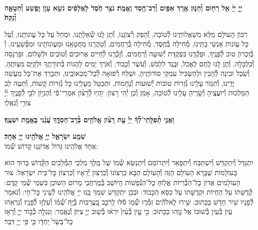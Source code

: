 \documentclass[twoside, openany, parskip=half, 11pt]{book}
\begin{document}
\pesicha

\begin{sometimes}

\\
 \textbf{יְיָ֣ יְיָ֔ אֵ֥ל רַח֖וּם וְ֯חַנּ֑וּן אֶ֥רֶךְ אַפַּ֖יִם וְ֯רַב־חֶ֥סֶד וֶאֱמֶֽת׃ נֹצֵ֥ר חֶ֙סֶד֙ לָאֲלָפִ֔ים נֹשֵׂ֥א עָוֺ֛ן וָפֶ֖שַׁע וְ֯חַטָּאָ֑ה וְ֯נַקֵּה֙׃}

רִבּוֺן הָעוׂלָם מַלֵּא מִשְׁאֲלוׂתֵֽינוּ לְ֯טוׂבָה, וְ֯הָפֵק רְ֯צוׂנֵֽנוּ, וְ֯תֶן לָֽנוּ שְׁ֯אֵלָתֵֽנוּ, וּמְחַל עַל כָּל עֲוׂנוׂתֵֽנוּ, וְ֯עַל כָּל עֲוׂנוׂת אַנְשֵׁי בָתֵּֽינוּ, מְ֯חִילָה בְּ֯חֶֽסֶד, מְ֯חִילָה בְּ֯רַחֲמִים, וְ֯טַהֲרֵֽנוּ מֵחֲטָאֵֽנוּ וּמֵעֲוׂנוׂתֵֽינוּ וּמִפְּ֯שָׁעֵֽינוּ, וְ֯ בְּ֯זִכְרוׂן טוׂב לְ֯פָנֶֽיךָ, וּפָקְ֯דֵֽנוּ בִּפְקֻדַּת יְ֯שׁוּעָה וְ֯רַחֲמִים, וְ֯זָכְ֯רֵֽנוּ לְ֯חַיִּים אֲרוּכִים וְ֯טוׂבִים וּלְשָׁלוׂם, וּפַרְנָסָה וְ֯כַלְכָּלָה, וְ֯תֶן לָֽנוּ לֶֽחֶם לֶאֱכׂל, וּבֶֽגֶד לִלְבּׂשׁ, וְ֯עׂשֶׁר וְ֯כָבוׂד, וְ֯אׂרֶךְ יָמִים לַהֲגוׂת בְּ֯תוׂרָתֶֽךָ וּלְקַיֵּם מִצְוׂתֶֽהָ, וְ֯שֵֽׂכֶל וּבִינָה לְ֯הָבִין וּלְהַשְׂכִּיל עִמְקֵי סוׂדוׂתֶֽיהָ, וּשְׁלַח רְ֯פוּאָה לְ֯כׇל־מַכְאוׂבֵֽינוּ, וּתְבָרֵךְ אֶת־כָּל מַעֲשֵׁה יָדֵֽינוּ, וְ֯תִגְזׂר עָלֵֽינוּ גְּ֯זֵרוׂת טוׂבוׂת יְ֯שׁוּעוׂת וְ֯נֶחָמוׂת, וּתְבַטֵּל מֵעָלֵֽינוּ כָּל גְּ֯זֵרוׂת קָשׁוׂת, וְ֯תַטֶּה לֵב הַמַּלְכוּת וְ֯יוׂעֲצֶֽיהָ וְ֯שָׂרֶֽיהָ עָלֵֽינוּ לְ֯טוׂבָה, אָמֵן וְ֯כֵן יְ֯הִי רָצוׂן:
%
יִ֥הְיֽוּ לְ֯רָצ֨וֹן אִמְרֵי־פִ֡י וְ֯הֶגְי֣וֹן לִבִּ֣י לְ֯פָנֶ֑יךָ יְ֜יָ֗ צוּרִ֥י וְ֯גֹֽאֲלִֽי׃


\textbf{וַאֲנִ֤י תְ֯פִלָּֽתִי־לְ֯ךָ֨ יְיָ֡ עֵ֤ת רָצ֗וֹן אֱלֹהִ֥ים בְּ֯רָב־חַסְדֶּ֑ךָ עֲ֝נֵ֗נִי בֶּאֱמֶ֥ת יִשְׁעֶֽךָ׃}

\end{sometimes}

\textbf{שְׁמַ֖ע יִשְׂרָאֵ֑ל יְיָ֥ אֱלֹהֵ֖ינוּ יְיָ֥ אֶחָֽד׃}\\

אֶחָד אֱלֹהֵֽינוּ גָּדוֹל אֲדוֹנֵֽנוּ קָדוֹשׁ שְׁ֯מוֹ:

\gadlu

\label{al hakol}
יִתְגַּדַּל וְ֯יִתְקַדַּשׁ וְ֯יִשְׁתַּבַּח וְ֯יִתְפָּאַר וְ֯יִתְרוֹמַם וְ֯יִתְנַשֵּׂא שְׁ֯מוֹ שֶׁל מֶֽלֶךְ מַלְכֵי הַמְּ֯לָכִים הַקְָּ֯דוֹשׁ בָּרוּךְ הוּא בָּעוֹלָמוֹת שֶׁבָּרָא הָעוֹלָם הַזֶּה וְ֯הָעוֹלָם הַבָּא כִּרְצוֹנוֹ וְ֯כִרְצוֹן יְ֯רֵאָיו וְ֯כִרְצוֹן כׇּל־בֵּית יִשְׂרָאֵל: צוּר הָעוֹלָמִים אֲדוֹן כׇּל־הַבְּ֯רִיּוֹת אֱלֽוֹהַּ כׇּל־הַנְּ֯פָשׁוֹת הַיּוֹשֵׁב בְּ֯מֶרְחֲבֵי מָרוֹם הַשּׁוֹכֵן בִּשְׁמֵי שְׁ֯מֵי קֶֽדֶם: קְ֯דֻשָּׁתוֹ עַל הַחַיּוֹת וּקְדֻשָּׁתוֹ עַל כִּסֵּא הַכָּבוֹד: וּבְכֵן יִתְקַדַּשׁ שִׁמְךָ בָּֽנוּ יְיָ אֱלֹהֵֽינוּ לְ֯עֵינֵי כׇּל־חָי: וְ֯נֹאמַר לְ֯פָנָיו שִׁיר חָדָשׁ כַּכָּתוּב:
שִׁ֥ירוּ לֵֽאלֹהִֽ֘ים זַמְּ֯ר֢וּ שְׁ֯֫מ֥וֹ סֹ֡לּוּ לָֽרֹכֵ֣ב בָּֽ֭עֲרָבוֹת בְּ֯יָ֥הּ שְׁ֯֝מ֗וֹ וְ֯עִלְז֥וּ לְ֯פָנָֽיו׃ וְ֯נִרְאֵֽהוּ עַֽיִן בְּ֯עַֽיִן בְּ֯שׁוּבוֹ אֶל נָוֵֽהוּ כַּכָּתוּב:
%
כִּ֣י עַ֤יִן בְּ֯עַ֨יִן֙ יִרְא֔וּ בְּ֯שׁ֥וּב יְיָ֖ צִיּֽוֹן׃ וְ֯נֶאֱמַר:
וְנִגְלָ֖ה כְּ֯ב֣וֹד יְיָ֑ וְ֯רָא֤וּ כׇל־בָּשָׂר֙ יַחְדָּ֔ו כִּ֛י פִּ֥י יְיָ֖ דִּבֵּֽר׃
\end{document}
